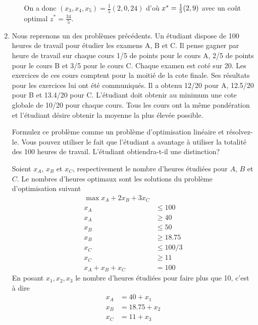 \begin{enumerate}
\begin{solution}
\begin{enumerate}
          On a donc $(x_3,x_4,x_5) = \frac{1}{5}(2,0,24)$ d'où
          $x^* = \frac{1}{5}(2, 9)$ avec un coût optimal
          $z^* = \frac{34}{5}$.
      \end{enumerate}
    \end{solution}

  \item Nous reprenons un des problèmes précédents.
    Un étudiant dispose de 100 heures de travail pour
    étudier les examens A, B et C.
    Il pense gagner par heure de travail sur chaque cours 1/5 de points pour
    le cours A, 2/5 de points pour le cours B et 3/5 pour le cours C.
    Chaque examen est coté sur 20.
    Les exercices de ces cours comptent pour la moitié de la cote finale.
    Ses résultats pour les exercices lui ont été communiqués.
    Il a obtenu 12/20 pour A, 12.5/20 pour B et 13.4/20 pour C.
    L'étudiant doit obtenir au minimum une cote globale de 10/20 pour chaque
    cours.
    Tous les cours ont la même pondération et l'étudiant désire obtenir la
    moyenne la plus élevée possible.

    Formulez ce problème comme un problème d'optimisation linéaire  et résolvez-le.
    Vous pouvez utiliser le fait que l'étudiant a avantage à utiliser la
    totalité des 100 heures de travail.
    L'étudiant obtiendra-t-il une distinction?

    \begin{solution}
      Soient $x_A$, $x_B$ et $x_C$, respectivement
      le nombre d'heures étudiées pour $A$, $B$ et $C$.
      Le nombres d'heures optimaux sont les solutions du problème
      d'optimisation suivant
      \begin{align*}
        \max x_A + 2x_B + 3x_C\\
        x_A & \leq 100\\
        x_A & \geq 40\\
        x_B & \leq 50\\
        x_B & \geq 18.75\\
        x_C & \leq 100/3\\
        x_C & \geq 11\\
        x_A + x_B + x_C & = 100
      \end{align*}
      En posant $x_1,x_2,x_3$ le nombre d'heures étudiées pour faire plus
      que 10, c'est à dire
      \begin{align*}
        x_A & = 40 + x_1\\
        x_B & = 18.75 + x_2\\
        x_C & = 11 + x_3
      \end{align*}


\end{solution}
\end{enumerate}
